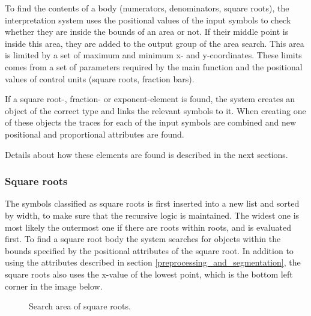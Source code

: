 To find the contents of a body (numerators, denominators, square roots), the interpretation system uses the positional values of the input symbols to check whether they are inside the bounds of an area or not. If their middle point is inside this area, they are added to the output group of the area search. This area is limited by a set of maximum and minimum x- and y-coordinates. These limits comes from a set of parameters required by the main function and the positional values of control units (square roots, fraction bars).

If a square root-, fraction- or exponent-element is found, the system creates an object of the correct type and links the relevant symbols to it. When creating one of these objects the traces for each of the input symbols are combined and new positional and proportional attributes are found.

Details about how these elements are found is described in the next sections.

\subsubsection{Square roots}
\label{interpretation-square-roots}

The symbols classified as square roots is first inserted into a new list and sorted by width, to make sure that the recursive logic is maintained. The widest one is most likely the outermost one if there are roots within roots, and is evaluated first. To find a square root body the system searches for objects within the bounds specified by the positional attributes of the square root. In addition to using the attributes described in section \ref{preprocessing_and_segmentation}, the square roots also uses the x-value of the lowest point, which is the bottom left corner in the image below.

\begin{figure}[H]
\centering
    \label{fig:interpretation}
\caption{Search area of square roots.}
\end{figure}

